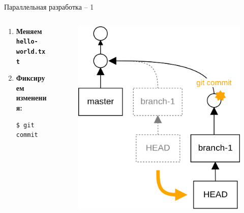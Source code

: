 \documentclass[presentation]{beamer}
\begin{document}

\begin{frame}[fragile]{Параллельная разработка -- 1}
  \begin{columns}
    \begin{column}{.5\textwidth}
      \begin{enumerate}
      \item \textbf{Меняем \texttt{hello-world.txt}}
      \item \textbf{Фиксируем изменения:}
\begin{verbatim}
$ git commit
\end{verbatim}
      \end{enumerate}
      \end{column}
      \begin{column}{.5\textwidth}
        \begin{figure}[htb]
          \centering
          \includegraphics[height=.7\textheight]{git-operation-branch-2}
        \end{figure}
      \end{column}
    \end{columns}
\end{frame}
\end{document}
